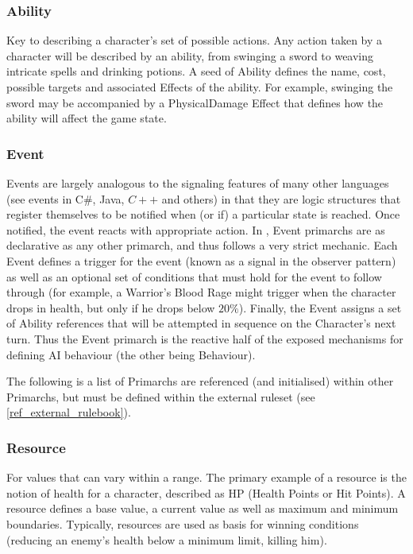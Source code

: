 \subsubsection{Ability} 
Key to describing a character's set of possible actions. Any action taken by a character will be described by an ability, from swinging a sword to weaving intricate spells and drinking potions. A seed of Ability defines the name, cost, possible targets and associated Effects of the ability. For example, swinging the sword may be accompanied by a PhysicalDamage Effect that defines how the ability will affect the game state.

\subsubsection{Event}
Events are largely analogous to the signaling features of many other languages (see events in C\#, Java, $C++$ and others) in that they are logic structures that register themselves to be notified when (or if) a particular state is reached. Once notified, the event reacts with appropriate action. In \langname, Event primarchs are as declarative as any other primarch, and thus follows a very strict mechanic. Each Event defines a trigger for the event (known as a signal in the observer pattern) as well as an optional set of conditions that must hold for the event to follow through (for example, a Warrior's Blood Rage might trigger when the character drops in health, but only if he drops below $20\%$). Finally, the Event assigns a set of Ability references that will be attempted in sequence on the Character's next turn. Thus the Event primarch is the reactive half of the exposed mechanisms for defining AI behaviour (the other being Behaviour).

\noindent The following is a list of Primarchs are referenced (and initialised) within other Primarchs, but must be defined within the external ruleset (see \vref{ref_external_rulebook}).

\subsubsection{Resource}
For values that can vary within a range. The primary example of a resource is the notion of health for a character, described as HP (Health Points or Hit Points). A resource defines a base value, a current value as well as maximum and minimum boundaries. Typically, resources are used as basis for winning conditions (reducing an enemy's health below a minimum limit, killing him).

